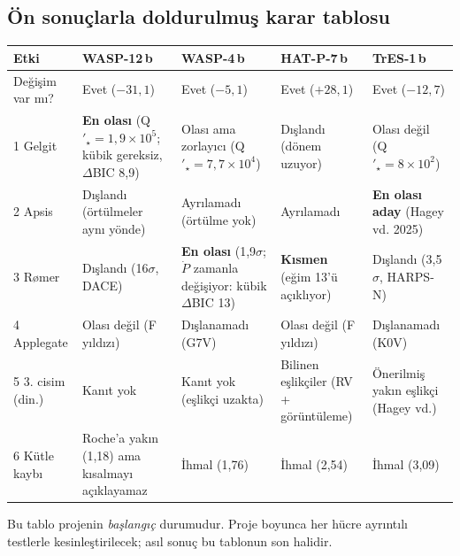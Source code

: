 \subsection{Ön sonuçlarla doldurulmuş karar tablosu}
\begin{center}
\small
\begin{tabularx}{\textwidth}{l >{\raggedright\arraybackslash}X >{\raggedright\arraybackslash}X >{\raggedright\arraybackslash}X >{\raggedright\arraybackslash}X}
\toprule
Etki & WASP-12\,b & WASP-4\,b & HAT-P-7\,b & TrES-1\,b\\
\midrule
Değişim var mı? & Evet ($-31{,}1$) & Evet ($-5{,}1$) & Evet ($+28{,}1$) & Evet ($-12{,}7$)\\
1 Gelgit & \textbf{En olası} (Q$'_\star=1{,}9\times10^5$; kübik gereksiz, $\Delta$BIC 8,9) & Olası ama zorlayıcı (Q$'_\star=7{,}7\times10^4$) & Dışlandı (dönem uzuyor) & Olası değil (Q$'_\star=8\times10^2$)\\
2 Apsis & Dışlandı (örtülmeler aynı yönde) & Ayrılamadı (örtülme yok) & Ayrılamadı & \textbf{En olası aday} (Hagey vd. 2025)\\
3 Rømer & Dışlandı (16$\sigma$, DACE) & \textbf{En olası} (1,9$\sigma$; $\dot P$ zamanla değişiyor: kübik $\Delta$BIC 13) & \textbf{Kısmen} (eğim 13'ü açıklıyor) & Dışlandı (3,5$\sigma$, HARPS-N)\\
4 Applegate & Olası değil (F yıldızı) & Dışlanamadı (G7V) & Olası değil (F yıldızı) & Dışlanamadı (K0V)\\
5 3. cisim (din.) & Kanıt yok & Kanıt yok (eşlikçi uzakta) & Bilinen eşlikçiler (RV + görüntüleme) & Önerilmiş yakın eşlikçi (Hagey vd.)\\
6 Kütle kaybı & Roche'a yakın (1,18) ama kısalmayı açıklayamaz & İhmal (1,76) & İhmal (2,54) & İhmal (3,09)\\
\bottomrule
\end{tabularx}
\end{center}
Bu tablo projenin \emph{başlangıç} durumudur. Proje boyunca her hücre ayrıntılı testlerle kesinleştirilecek; asıl
sonuç bu tablonun son halidir.


